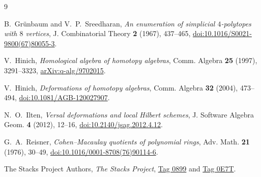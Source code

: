 \documentclass[11pt]{article}
\theoremstyle{definition}
\theoremstyle{remark}
\begin{document}
\begin{thebibliography}{9}

B.~Gr\"unbaum and V.~P.~Sreedharan,
\emph{An enumeration of simplicial $4$-polytopes with $8$ vertices},
J. Combinatorial Theory \textbf{2} (1967), 437--465,
\href{https://doi.org/10.1016/S0021-9800(67)80055-3}{doi:10.1016/S0021-9800(67)80055-3}.

V.~Hinich,
\emph{Homological algebra of homotopy algebras},
Comm. Algebra \textbf{25} (1997), 3291--3323,
\href{https://arxiv.org/abs/q-alg/9702015}{arXiv:q-alg/9702015}.

V.~Hinich,
\emph{Deformations of homotopy algebras},
Comm. Algebra \textbf{32} (2004), 473--494,
\href{https://doi.org/10.1081/AGB-120027907}{doi:10.1081/AGB-120027907}.

N.~O.~Ilten,
\emph{Versal deformations and local Hilbert schemes},
J. Software Algebra Geom. \textbf{4} (2012), 12--16,
\href{https://doi.org/10.2140/jsag.2012.4.12}{doi:10.2140/jsag.2012.4.12}.

G.~A.~Reisner,
\emph{Cohen--Macaulay quotients of polynomial rings},
Adv. Math. \textbf{21} (1976), 30--49,
\href{https://doi.org/10.1016/0001-8708(76)90114-6}{doi:10.1016/0001-8708(76)90114-6}.

The Stacks Project Authors,
\emph{The Stacks Project},
\href{https://stacks.math.columbia.edu/tag/0899}{Tag 0899}
and \href{https://stacks.math.columbia.edu/tag/0E7T}{Tag 0E7T}.

\end{thebibliography}
\end{document}
